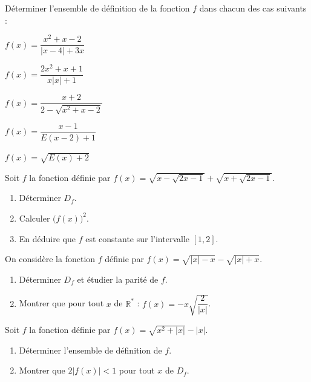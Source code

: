 Déterminer l'ensemble de définition de la fonction $f$ dans chacun des cas suivants :
\begin{enumerate*}[label=\arabic*),itemjoin={\quad}]
\item $f(x)=\dfrac{x^2+x-2}{|x-4|+3x}$
\item $f(x)=\dfrac{2x^2+x+1}{x|x|+1}$
\item $f(x)=\dfrac{x+2}{2-\sqrt{x^2+x-2}}$
\item $f(x)=\dfrac{x-1}{E(x-2)+1}$
\item $f(x)=\sqrt{E(x)+2}$
\end{enumerate*}
\fin
{}
Soit $f$ la fonction définie par $f(x)=\sqrt{x-\sqrt{2x-1}}+\sqrt{x+\sqrt{2x-1}}$.
\begin{enumerate}
\item Déterminer $D_f$.
\item Calculer $\big(f(x)\big)^2$.
\item En déduire que $f$ est constante sur l'intervalle $[1,2]$.
\end{enumerate}
\fin
{}
On considère la fonction $f$ définie par $f(x)=\sqrt{|x|-x}-\sqrt{|x|+x}$.
\begin{enumerate}
\item Déterminer $D_f$ et étudier la parité de $f$.
\item Montrer que pour tout $x$ de $\mathbb{R}^*$ : $f(x)=-x\sqrt{\dfrac{2}{|x|}}$.
\end{enumerate}
\fin
{}
Soit $f$ la fonction définie par $f(x)=\sqrt{x^2+|x|}-|x|$.
\begin{enumerate}
\item Déterminer l'ensemble de définition de $f$.
\item Montrer que $2|f(x)|<1$ pour tout $x$ de $D_f$.
\end{enumerate}
\fin
